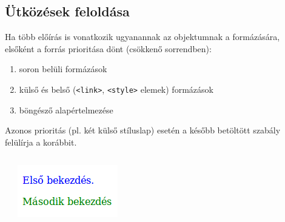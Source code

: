 \subsection{Ütközések feloldása}

\begin{frame}
  Ha több előírás is vonatkozik ugyanannak az objektumnak a formázására, elsőként a forrás prioritása dönt (csökkenő sorrendben):
  \begin{enumerate}
    \item soron belüli formázások
    \item külső és belső (\texttt{<link>}, \texttt{<style>} elemek) formázások
    \item böngésző alapértelmezése
  \end{enumerate}
  Azonos prioritás (pl. két külső stíluslap) esetén a később betöltött szabály felülírja a korábbit.
\end{frame}

\begin{frame}
  \begin{exampleblock}{}
    \scriptsize
    
  \end{exampleblock}
  \begin{columns}[T]
      \begin{exampleblock}{}
        \scriptsize
        
      \end{exampleblock}
      \includegraphics[width=.66\textwidth]{utkozes1.png}
  \end{columns} 
\end{frame}

